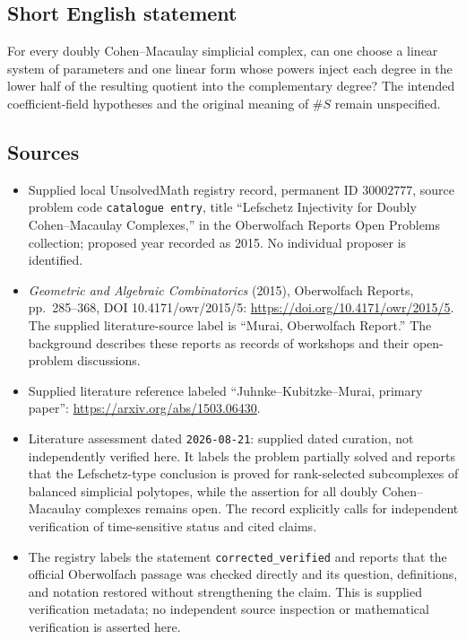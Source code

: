 \documentclass[11pt]{article}
\begin{document}
\subsection{Short English statement}
For every doubly Cohen--Macaulay simplicial complex, can one choose a linear system of parameters and one linear form whose powers inject each degree in the lower half of the resulting quotient into the complementary degree? The intended coefficient-field hypotheses and the original meaning of \(\#S\) remain unspecified.
\subsection{Sources}
\begin{itemize}
\item Supplied local UnsolvedMath registry record, permanent ID \(30002777\), source problem code \texttt{catalogue entry}, title ``Lefschetz Injectivity for Doubly Cohen--Macaulay Complexes,'' in the Oberwolfach Reports Open Problems collection; proposed year recorded as 2015. No individual proposer is identified.
\item \emph{Geometric and Algebraic Combinatorics} (2015), Oberwolfach Reports, pp.~285--368, DOI 10.4171/owr/2015/5: \url{https://doi.org/10.4171/owr/2015/5}. The supplied literature-source label is ``Murai, Oberwolfach Report.'' The background describes these reports as records of workshops and their open-problem discussions.
\item Supplied literature reference labeled ``Juhnke--Kubitzke--Murai, primary paper'': \url{https://arxiv.org/abs/1503.06430}.
\item Literature assessment dated \texttt{2026-08-21}: supplied dated curation, not independently verified here. It labels the problem partially solved and reports that the Lefschetz-type conclusion is proved for rank-selected subcomplexes of balanced simplicial polytopes, while the assertion for all doubly Cohen--Macaulay complexes remains open. The record explicitly calls for independent verification of time-sensitive status and cited claims.
\item The registry labels the statement \texttt{corrected\_verified} and reports that the official Oberwolfach passage was checked directly and its question, definitions, and notation restored without strengthening the claim. This is supplied verification metadata; no independent source inspection or mathematical verification is asserted here.
\end{itemize}
\end{document}
